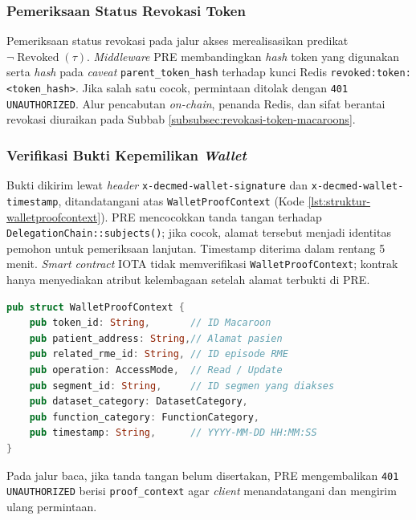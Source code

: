 \subsubsection{Pemeriksaan Status Revokasi Token}
\label{subsec:pemeriksaan-status-revokasi-token}

Pemeriksaan status revokasi pada jalur akses merealisasikan predikat $\neg\operatorname{Revoked}(\tau)$. \textit{Middleware} PRE membandingkan \textit{hash} token yang digunakan serta \textit{hash} pada \textit{caveat} \texttt{parent\_token\_hash} terhadap kunci Redis \texttt{revoked:token:<token\_hash>}. Jika salah satu cocok, permintaan ditolak dengan \texttt{401 UNAUTHORIZED}. Alur pencabutan \textit{on-chain}, penanda Redis, dan sifat berantai revokasi diuraikan pada Subbab \ref{subsubsec:revokasi-token-macaroons}.

\subsubsection{Verifikasi Bukti Kepemilikan \textit{Wallet}}
\label{subsec:verifikasi-bukti-kepemilikan-wallet}

Bukti dikirim lewat \textit{header} \texttt{x-decmed-wallet-signature} dan \texttt{x-decmed-wallet-timestamp}, ditandatangani atas \texttt{WalletProofContext} (Kode \ref{lst:struktur-walletproofcontext}). PRE mencocokkan tanda tangan terhadap \texttt{DelegationChain::subjects()}; jika cocok, alamat tersebut menjadi identitas pemohon untuk pemeriksaan lanjutan. Timestamp diterima dalam rentang 5 menit. \textit{Smart contract} IOTA tidak memverifikasi \texttt{WalletProofContext}; kontrak hanya menyediakan atribut kelembagaan setelah alamat terbukti di PRE.

\begin{lstlisting}[language=Rust, caption={Struktur \texttt{WalletProofContext} sebagai konteks verifikasi \textit{wallet signature}}, label={lst:struktur-walletproofcontext}]
pub struct WalletProofContext {
	pub token_id: String,       // ID Macaroon
	pub patient_address: String,// Alamat pasien
	pub related_rme_id: String, // ID episode RME
	pub operation: AccessMode,  // Read / Update
	pub segment_id: String,     // ID segmen yang diakses
	pub dataset_category: DatasetCategory,
	pub function_category: FunctionCategory,
	pub timestamp: String,		// YYYY-MM-DD HH:MM:SS
}
\end{lstlisting}

Pada jalur baca, jika tanda tangan belum disertakan, PRE mengembalikan \texttt{401 UNAUTHORIZED} berisi \texttt{proof\_context} agar \textit{client} menandatangani dan mengirim ulang permintaan.

